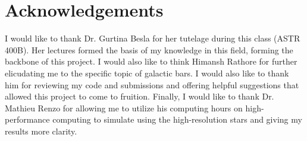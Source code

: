 \documentclass[twocolumn]{aastex631}
\begin{document}
\section{Acknowledgements}

I would like to thank Dr. Gurtina Besla for her tutelage during this
class (ASTR 400B). Her lectures formed the basis of my knowledge in
this field, forming the backbone of this project. I would also like to
think Himansh Rathore for further elicudating me to the specific topic
of galactic bars. I would also like to thank him for reviewing my code
and submissions and offering helpful suggestions that allowed this
project to come to fruition. Finally, I would like to thank
Dr. Mathieu Renzo for allowing me to utilize his computing hours on
high-performance computing to simulate using the high-resolution stars
and giving my results more clarity.
  


\end{document}
